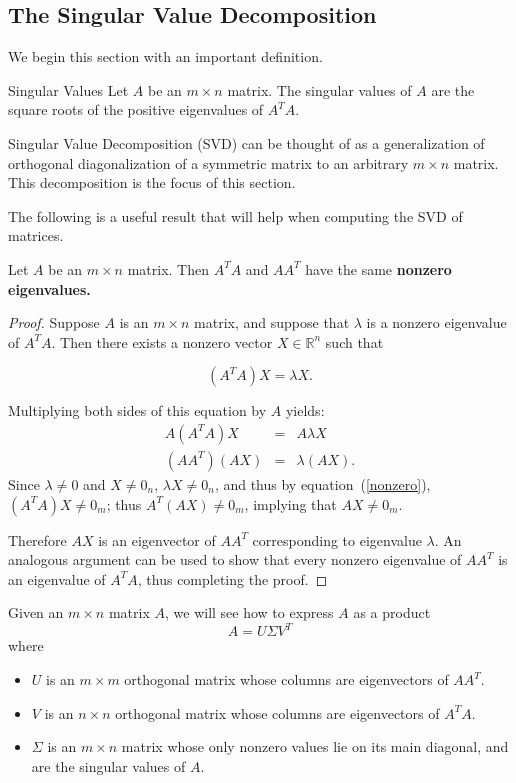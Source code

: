 \subsection{The Singular Value Decomposition}

We begin this section with an important definition.

\begin{definition}{Singular Values}\label{def:singularvalues}
Let $A$ be an $m\times n$ matrix. The singular values of $A$ are the square roots of the positive
eigenvalues of $A^TA.$ 
\end{definition}

Singular Value Decomposition (SVD) can be thought of as 
a generalization of orthogonal diagonalization of a symmetric matrix
to an arbitrary $m\times n$ matrix. This decomposition is the focus of this section. 

The following is a useful result that will help when computing the SVD of matrices.

\begin{proposition}{}\label{prop:samenonzeroeigenvalues}
Let $A$ be an $m \times n$ matrix. Then $A^TA$ and $AA^T$ have the same \bf{nonzero} eigenvalues.
\end{proposition}

\begin{proof}
Suppose $A$ is an $m\times n$ matrix, and suppose that  $\lambda$ is a nonzero eigenvalue of $A^TA$.
Then there exists a nonzero vector $X\in \mathbb{R}^n$ such that

\begin{equation}\label{nonzero}
(A^TA)X=\lambda X.
\end{equation}

Multiplying both sides of this equation by $A$ yields:
\begin{eqnarray*}
A(A^TA)X & = & A\lambda X\\
(AA^T)(AX) & = & \lambda (AX).
\end{eqnarray*}
Since $\lambda\neq 0$ and $X\neq 0_n$, $\lambda X\neq 0_n$,
and thus by equation~(\ref{nonzero}),
$(A^TA)X\neq 0_m$; thus $A^T(AX)\neq 0_m$, 
implying that $AX\neq 0_m$.

Therefore $AX$ is an eigenvector of $AA^T$ corresponding to eigenvalue
$\lambda$.  An analogous argument can be used to show that every
nonzero eigenvalue of $AA^T$ is an eigenvalue of $A^TA$, thus
completing the proof.
\end{proof}

Given an $m\times n$ matrix $A$, we will see how to express $A$ as a product
\[ A=U\Sigma V^T\]
where
\begin{itemize}
\item $U$ is an $m\times m$ orthogonal matrix whose columns are
eigenvectors of $AA^T$.
\item $V$ is an $n\times n$ orthogonal matrix whose columns are
eigenvectors of $A^TA$.
\item $\Sigma$ is an $m\times n$ matrix whose only nonzero values
lie on its main diagonal, and are the singular values of $A$.
\end{itemize}

